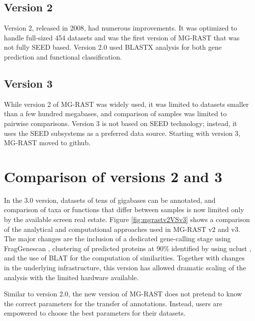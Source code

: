 \documentclass[12pt,fullpage]{report}
\begin{document}
\subsection*{Version 2}
Version 2, released in 2008, had numerous improvements. It was optimized to handle full-sized 454 datasets and was the first version of MG-RAST that was not fully \gls{SEED} based.
Version 2.0 used BLASTX analysis for both gene prediction and functional classification\cite{MG-RAST}.
\subsection*{Version 3}
While version 2 of MG-RAST was widely used, it was limited to datasets smaller than a few hundred megabases, and comparison of samples was limited to pairwise comparisons. Version 3 is not based on \gls{SEED} technology; instead, it uses the SEED subsystems as a preferred data source.
Starting with version 3, MG-RAST moved to github.
\section{Comparison of versions 2 and 3}

In the 3.0 version, datasets of tens of gigabases can be annotated, and comparison of taxa or functions that differ between samples is now limited only by the available screen real estate. Figure \ref{fig:mgrastv2VSv3} shows a comparison of the analytical and computational approaches used in MG-RAST v2 and v3. The major changes are the inclusion of a dedicated gene-calling stage using FragGenescan \cite{FGS}, clustering of predicted proteins at 90\% identified by using uclust \cite{UCLUST}, and the use of BLAT \cite{BLAT} for the computation of similarities. Together with changes in the underlying infrastructure, this version has allowed dramatic scaling of the analysis with the limited hardware available.

Similar to version 2.0, the new version of MG-RAST does not pretend to know the correct parameters for the transfer of annotations. Instead, users are empowered to choose the best parameters for their datasets.
\end{document}
